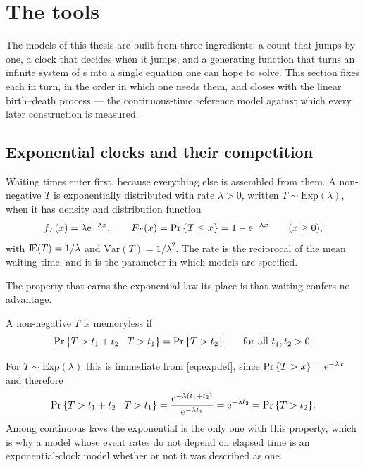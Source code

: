\section{The tools}
\label{sec:tools}

The models of this thesis are built from three ingredients: a count that jumps by one,
a clock that decides when it jumps, and a generating function that turns an infinite
system of \de s into a single equation one can hope to solve. This section fixes each
in turn, in the order in which one needs them, and closes with the linear birth--death
process --- the continuous-time reference model against which every later construction
is measured.

\subsection{Exponential clocks and their competition}
\label{sec:exp}

Waiting times enter first, because everything else is assembled from them. A
non-negative \rv{} $T$ is exponentially distributed with rate $\lambda>0$, written
$T\sim\text{Exp}(\lambda)$, when it has density and distribution function
\begin{equation}
\label{eq:expdef}
f_T(x) = \lambda{\rm e}^{-\lambda x},
\qquad
F_T(x) = {\text{Pr}\left\{T\le x\right\}} = 1-{\rm e}^{-\lambda x}
\qquad (x\ge0),
\end{equation}
with ${\rm I}\!{\rm E}(T) = 1/\lambda$ and $\text{Var}(T) = 1/\lambda^2$. The rate is the reciprocal
of the mean waiting time, and it is the parameter in which models are specified.

The property that earns the exponential law its place is that waiting confers no
advantage.

\begin{definition}[Memorylessness]
\label{def:memoryless}
A non-negative \rv{} $T$ is memoryless if
\begin{equation}
\label{eq:memoryless}
{\text{Pr}\left\{T > t_1+t_2 \mid T > t_1\right\}} = {\text{Pr}\left\{T > t_2\right\}}
\qquad\text{for all } t_1,t_2>0 .
\end{equation}
\end{definition}

\noindent
For $T\sim\text{Exp}(\lambda)$ this is immediate from \cref{eq:expdef}, since
${\text{Pr}\left\{T>x\right\}} = {\rm e}^{-\lambda x}$ and therefore
\begin{equation*}
{\text{Pr}\left\{T > t_1+t_2 \mid T > t_1\right\}}
= \frac{{\rm e}^{-\lambda(t_1+t_2)}}{{\rm e}^{-\lambda t_1}}
= {\rm e}^{-\lambda t_2} = {\text{Pr}\left\{T > t_2\right\}}.
\end{equation*}
Among continuous laws the exponential is the only one with this property, which is why
a model whose event rates do not depend on elapsed time is an exponential-clock model
whether or not it was described as one.

